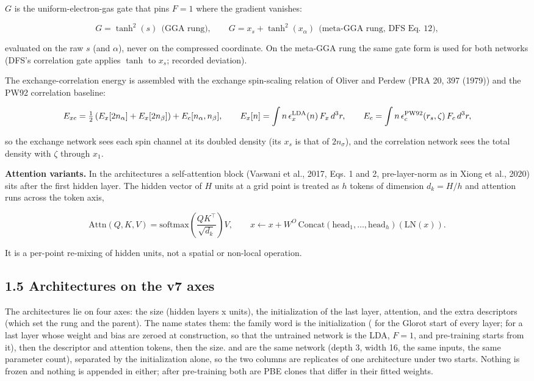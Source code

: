 \documentclass[10pt,a4paper]{article}
\begin{document}
$G$ is the uniform-electron-gas gate that pins $F = 1$ where the gradient vanishes:

\[
G = \tanh^2(s) \ \ \text{(GGA rung)}, \qquad
G = x_s + \tanh^2(x_\alpha) \ \ \text{(meta-GGA rung, DFS Eq. 12)},
\]

evaluated on the raw $s$ (and $\alpha$), never on the compressed coordinate. On the meta-GGA rung the same gate form is used for both networks (DFS's correlation gate applies $\tanh$ to $x_s$; recorded deviation).

The exchange-correlation energy is assembled with the exchange spin-scaling relation of Oliver and Perdew (PRA 20, 397 (1979)) and the PW92 correlation baseline:

\[
E_{xc} = \tfrac12\left(E_x[2 n_\alpha] + E_x[2 n_\beta]\right) + E_c[n_\alpha, n_\beta], \qquad
E_x[n] = \int n\, \epsilon_x^{\rm LDA}(n)\, F_x\, d^3r, \qquad
E_c = \int n\, \epsilon_c^{\rm PW92}(r_s, \zeta)\, F_c\, d^3r,
\]

so the exchange network sees each spin channel at its doubled density (its $x_s$ is that of $2 n_\sigma$), and the correlation network sees the total density with $\zeta$ through $x_1$.

\textbf{Attention variants.} In the  architectures a self-attention block (Vaswani et al., 2017, Eqs. 1 and 2, pre-layer-norm as in Xiong et al., 2020) sits after the first hidden layer. The hidden vector of $H$ units at a grid point is treated as $h$ tokens of dimension $d_k = H/h$ and attention runs across the token axis,

\[
\mathrm{Attn}(Q, K, V) = \mathrm{softmax}\!\left(\frac{QK^{\top}}{\sqrt{d_k}}\right) V, \qquad
x \leftarrow x + W^{O}\,\mathrm{Concat}(\mathrm{head}_1, \ldots, \mathrm{head}_h)(\mathrm{LN}(x)).
\]

It is a per-point re-mixing of hidden units, not a spatial or non-local operation.

\subsection*{1.5 Architectures on the v7 axes}

The architectures lie on four axes: the size (hidden layers x units), the initialization of the last layer, attention, and the extra descriptors (which set the rung and the parent). The name states them: the family word is the initialization ( for the Glorot start of every layer;  for a last layer whose weight and bias are zeroed at construction, so that the untrained network is the LDA, $F = 1$, and pre-training starts from it), then the descriptor and attention tokens, then the size.  and  are the same network (depth 3, width 16, the same inputs, the same parameter count), separated by the initialization alone, so the two columns are replicates of one architecture under two starts. Nothing is frozen and nothing is appended in either; after pre-training both are PBE clones that differ in their fitted weights.
\end{document}
